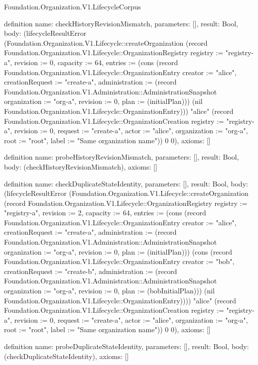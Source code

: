\begin{lexlean}{Foundation.Organization.V1.LifecycleCorpus}
\begin{semanticmodule}
definition{
  name: checkHistoryRevisionMismatch,
  parameters: [],
  result: Bool,
  body: (lifecycleResultError (Foundation.Organization.V1.Lifecycle::createOrganization (record Foundation.Organization.V1.Lifecycle::OrganizationRegistry {registry := "registry-a", revision := 0, capacity := 64, entries := (cons (record Foundation.Organization.V1.Lifecycle::OrganizationEntry {creator := "alice", creationRequest := "create-a", administration := (record Foundation.Organization.V1.Administration::AdministrationSnapshot {organization := "org-a", revision := 0, plan := (initialPlan)})}) (nil Foundation.Organization.V1.Lifecycle::OrganizationEntry))}) "alice" (record Foundation.Organization.V1.Lifecycle::OrganizationCreation {registry := "registry-a", revision := 0, request := "create-a", actor := "alice", organization := "org-a", root := "root", label := "Same organization name"})) 0 0),
  axioms: []
}

definition{
  name: probeHistoryRevisionMismatch,
  parameters: [],
  result: Bool,
  body: (checkHistoryRevisionMismatch),
  axioms: []
}

definition{
  name: checkDuplicateStateIdentity,
  parameters: [],
  result: Bool,
  body: (lifecycleResultError (Foundation.Organization.V1.Lifecycle::createOrganization (record Foundation.Organization.V1.Lifecycle::OrganizationRegistry {registry := "registry-a", revision := 2, capacity := 64, entries := (cons (record Foundation.Organization.V1.Lifecycle::OrganizationEntry {creator := "alice", creationRequest := "create-a", administration := (record Foundation.Organization.V1.Administration::AdministrationSnapshot {organization := "org-a", revision := 0, plan := (initialPlan)})}) (cons (record Foundation.Organization.V1.Lifecycle::OrganizationEntry {creator := "bob", creationRequest := "create-b", administration := (record Foundation.Organization.V1.Administration::AdministrationSnapshot {organization := "org-a", revision := 0, plan := (bobInitialPlan)})}) (nil Foundation.Organization.V1.Lifecycle::OrganizationEntry)))}) "alice" (record Foundation.Organization.V1.Lifecycle::OrganizationCreation {registry := "registry-a", revision := 0, request := "create-a", actor := "alice", organization := "org-a", root := "root", label := "Same organization name"})) 0 0),
  axioms: []
}

definition{
  name: probeDuplicateStateIdentity,
  parameters: [],
  result: Bool,
  body: (checkDuplicateStateIdentity),
  axioms: []
}


\end{semanticmodule}
\end{lexlean}
